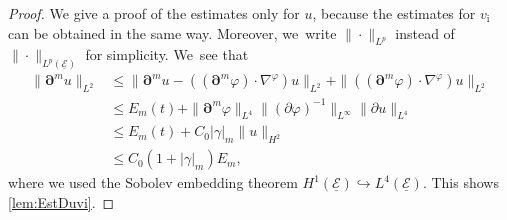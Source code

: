 \documentclass[11pt]{article}
\newcommand{\cE}{{\mathcal E}}
\newcommand{\ul}[1]{\underline{#1}}
\theoremstyle{definition}
\begin{document}
\begin{proof}
We give a proof of the estimates only for $u$, because the estimates for $v_\mathrm{i}$ can be obtained in the same way.
Moreover, we~write $\|\cdot\|_{L^p}$ instead of $\|\cdot\|_{L^p(\ul{\cE})}$ for simplicity. We~see that
\begin{align*}
\|\bm{\partial}^m u\|_{L^2}
&\leq \|\bm{\partial}^m u - ((\bm{\partial}^m\varphi)\cdot\nabla^\varphi)u\|_{L^2}
+ \|((\bm{\partial}^m\varphi)\cdot\nabla^\varphi)u\|_{L^2} \\
&\leq E_m(t) + \|\bm{\partial}^m\varphi\|_{L^4} \|(\partial\varphi)^{-1}\|_{L^\infty} \|\partial u\|_{L^4} \\
&\leq E_m(t) + C_0|\gamma|_m \|u\|_{H^2} \\
&\leq C_0(1+|\gamma|_m)E_m,
\end{align*}
where we used the Sobolev embedding theorem $H^1(\ul{\cE}) \hookrightarrow L^4(\ul{\cE})$.
This shows \eqref{lem:EstDuvi}.


\end{proof}
\end{document}
